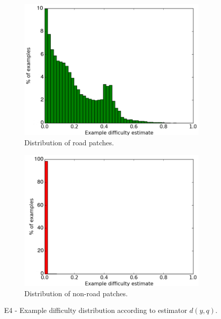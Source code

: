 \begin{figure}
\begin{subfigure}{0.5\textwidth}
\includegraphics[width=\linewidth]{figs/E4/E4-road-dist2.png}
\caption{Distribution of road patches.} \label{fig:E4_difficulty_distribution_road}
\end{subfigure}
\hspace*{\fill} %
\begin{subfigure}{0.5\textwidth}
\includegraphics[width=\linewidth]{figs/E4/E4-non_road-dist2.png}
\caption{Distribution of non-road patches.} \label{fig:E4_difficulty_distribution_nonroad}
\end{subfigure}
\hspace*{\fill} %
\caption[E4 - Difficulty distribution]{E4 - Example difficulty distribution according to estimator $d(y,q)$. } \label{fig:E4_difficulty_distribution}
\end{figure}

